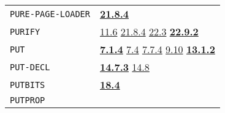\documentclass[a4paper]{scrbook}
\begin{document}
\begin{longtable}[]{@{}ll@{}}
\begin{minipage}[t]{0.24\columnwidth}
\texttt{PURE-PAGE-LOADER}\strut
\end{minipage} & \begin{minipage}[t]{0.70\columnwidth}\raggedright\strut
\textbf{\href{21-interrupts.md\#2184-gc}{21.8.4}}\strut
\end{minipage}\tabularnewline
\begin{minipage}[t]{0.24\columnwidth}\raggedright\strut
\texttt{PURIFY}\strut
\end{minipage} & \begin{minipage}[t]{0.70\columnwidth}\raggedright\strut
\href{11-input-output.md\#116-save-files}{11.6} \href{21-interrupts.md\#2184-gc}{21.8.4}
\href{22-storage-management.md\#223-other-storage}{22.3}
\textbf{\href{22-storage-management.md\#2292-purify}{22.9.2}}\strut
\end{minipage}\tabularnewline
\begin{minipage}[t]{0.24\columnwidth}\raggedright\strut
\texttt{PUT}\strut
\end{minipage} & \begin{minipage}[t]{0.70\columnwidth}\raggedright\strut
\textbf{\href{07-structured-objects.md\#714-put-1}{7.1.4}} \href{07-structured-objects.md\#74-examples-1}{7.4}
\href{07-structured-objects.md\#774-note-on-efficiency-1}{7.7.4} \href{09-functions.md\#910-apply-1}{9.10}
\textbf{\href{13-association-properties.md\#1312-put}{13.1.2}}\strut
\end{minipage}\tabularnewline
\begin{minipage}[t]{0.24\columnwidth}\raggedright\strut
\texttt{PUT-DECL}\strut
\end{minipage} & \begin{minipage}[t]{0.70\columnwidth}\raggedright\strut
\textbf{\href{14-data-type-declarations.md\#1473-get-decl-and-put-decl}{14.7.3}}
\href{14-data-type-declarations.md\#148-offset}{14.8}\strut
\end{minipage}\tabularnewline
\begin{minipage}[t]{0.24\columnwidth}\raggedright\strut
\texttt{PUTBITS}\strut
\end{minipage} & \begin{minipage}[t]{0.70\columnwidth}\raggedright\strut
\textbf{\href{18-machine-words-and-bits.md\#184-putbits}{18.4}}\strut
\end{minipage}\tabularnewline
\begin{minipage}[t]{0.24\columnwidth}\raggedright\strut
\texttt{PUTPROP}\strut
\end{minipage} & \begin{minipage}[t]{0.70\columnwidth}\raggedright\strut

\end{minipage}
\end{longtable}
\end{document}
